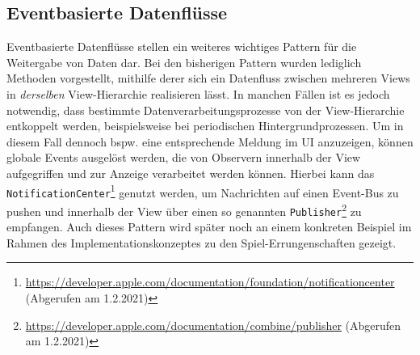 \subsection{Eventbasierte Datenflüsse}

Eventbasierte Datenflüsse stellen ein weiteres wichtiges Pattern für die Weitergabe von Daten dar. Bei den bisherigen Pattern wurden lediglich Methoden vorgestellt, mithilfe derer sich ein Datenfluss zwischen mehreren Views in \textit{derselben} View-Hierarchie realisieren lässt. In manchen Fällen ist es jedoch notwendig, dass bestimmte Datenverarbeitungsprozesse von der View-Hierarchie entkoppelt werden, beispielsweise bei periodischen Hintergrundprozessen. Um in diesem Fall dennoch bspw. eine entsprechende Meldung im UI anzuzeigen, können globale Events ausgelöst werden, die von Observern innerhalb der View aufgegriffen und zur Anzeige verarbeitet werden können. Hierbei kann das \texttt{NotificationCenter}\footnote{\url{https://developer.apple.com/documentation/foundation/notificationcenter} (Abgerufen am 1.2.2021)} genutzt werden, um Nachrichten auf einen Event-Bus zu pushen und innerhalb der View über einen so genannten \texttt{Publisher}\footnote{\url{https://developer.apple.com/documentation/combine/publisher} (Abgerufen am 1.2.2021)} zu empfangen. Auch dieses Pattern wird später noch an einem konkreten Beispiel im Rahmen des Implementationskonzeptes zu den Spiel-Errungenschaften gezeigt.
